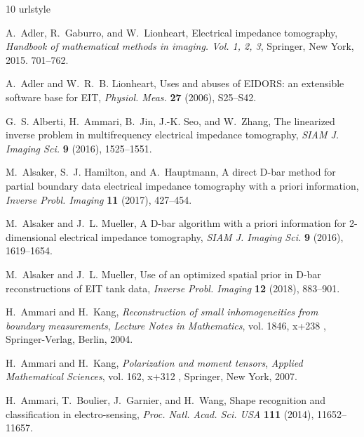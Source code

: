 \documentclass[11pt]{article}
\begin{document}
\begin{thebibliography}{10}
	\providecommand{\url}[1]{\texttt{#1}}
	\providecommand{\urlprefix}{URL }
	\expandafter\ifx\csname urlstyle\endcsname\relax
	\providecommand{\doi}[1]{doi:\discretionary{}{}{}#1}\else
	\providecommand{\doi}{doi:\discretionary{}{}{}\begingroup
		\urlstyle{rm}\Url}\fi
	
	A.~Adler, R.~Gaburro, and W.~Lionheart, Electrical impedance tomography,
	\textit{Handbook of mathematical methods in imaging. {V}ol. 1, 2, 3},
	Springer, New York, 2015. 701--762.
	
	A.~Adler and W.~R.~B. Lionheart, Uses and abuses of {EIDORS}: an extensible
	software base for {EIT}, \textit{Physiol. Meas.} \textbf{27} (2006),
	S25--S42.
	
	G.~S. Alberti, H.~Ammari, B.~Jin, J.-K. Seo, and W.~Zhang, The linearized
	inverse problem in multifrequency electrical impedance tomography,
	\textit{SIAM J. Imaging Sci.} \textbf{9} (2016), 1525--1551.
	
	M.~Alsaker, S.~J. Hamilton, and A.~Hauptmann, A direct {D}-bar method for
	partial boundary data electrical impedance tomography with a priori
	information, \textit{Inverse Probl. Imaging} \textbf{11} (2017), 427--454.
	
	M.~Alsaker and J.~L. Mueller, A {D}-bar algorithm with a priori information for
	2-dimensional electrical impedance tomography, \textit{SIAM J. Imaging Sci.}
	\textbf{9} (2016), 1619--1654.
	
	M.~Alsaker and J.~L. Mueller, Use of an optimized spatial prior in {D}-bar
	reconstructions of {EIT} tank data, \textit{Inverse Probl. Imaging}
	\textbf{12} (2018), 883--901.
	
	H.~Ammari and H.~Kang, \textit{Reconstruction of small inhomogeneities from
		boundary measurements}, \textit{Lecture Notes in Mathematics}, vol. 1846,
	x+238 , Springer-Verlag, Berlin, 2004.
	
	H.~Ammari and H.~Kang, \textit{Polarization and moment tensors},
	\textit{Applied Mathematical Sciences}, vol. 162, x+312 , Springer, New York,
	2007.
	
	H.~Ammari, T.~Boulier, J.~Garnier, and H.~Wang, Shape recognition and
	classification in electro-sensing, \textit{Proc. Natl. Acad. Sci. USA}
	\textbf{111} (2014), 11652--11657.
	

\end{thebibliography}
\end{document}
